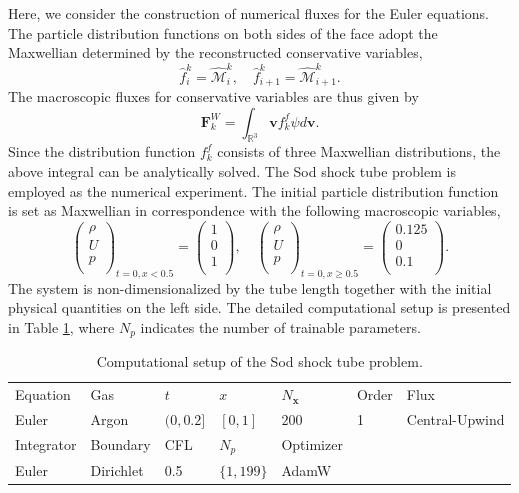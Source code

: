 \documentclass[preprint,3p,12pt,sort&compress]{elsarticle}
\begin{document}
Here, we consider the construction of numerical fluxes for the Euler equations.
The particle distribution functions on both sides of the face adopt the Maxwellian determined by the reconstructed conservative variables,
\begin{equation}
    \hat f_i^k = \hat{\mathcal M}_i^k, \quad \hat f_{i+1}^k = \hat{\mathcal M}_{i+1}^k.
\end{equation}
The macroscopic fluxes for conservative variables are thus given by
\begin{equation}
    \mathbf F^W_k = \int_{\mathbb R^3} \mathbf v f_k^f\psi d\mathbf v.
    \label{eq:flux macro}
\end{equation}
Since the distribution function $f_k^f$ consists of three Maxwellian distributions, the above integral can be analytically solved.
The Sod shock tube problem is employed as the numerical experiment.
The initial particle distribution function is set as Maxwellian in correspondence with the following macroscopic variables,
\begin{equation}
\left(\begin{array}{c}
\rho \\
U \\
p \\
\end{array}\right)_{{t=0,x<0.5}}=\left(\begin{array}{c}
1 \\
0 \\
1 \\
\end{array}\right), \quad 
\left(\begin{array}{c}
\rho \\
U \\
p \\
\end{array}\right)_{{t=0,x\ge 0.5}}=\left(\begin{array}{c}
0.125 \\
0 \\
0.1 \\
\end{array}\right).
\end{equation}
The system is non-dimensionalized by the tube length together with the initial physical quantities on the left side.
The detailed computational setup is presented in Table \ref{tab:sod}, 
where $N_p$ indicates the number of trainable parameters.
\begin{table}[htbp]
    \caption{Computational setup of the Sod shock tube problem.} 
    \centering
    \begin{tabular}{lllllll} 
        \hline
        Equation & Gas & $t$ & $x$ & $N_{\mathbf x}$ & Order & Flux \\ 
        Euler & Argon & $(0,0.2]$ & $[0,1]$ & $200$ & 1 & Central-Upwind \\ 
        \hline
        Integrator & Boundary & CFL & $N_{p}$ & Optimizer \\
        Euler & Dirichlet & 0.5 & $\{1,199\}$ & AdamW \\
        \hline
    \end{tabular} 
    \label{tab:sod}
\end{table}
\end{document}
